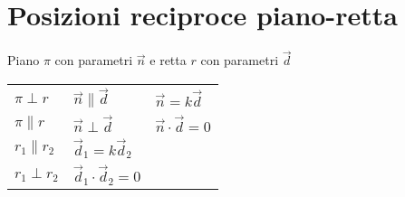\section{Posizioni reciproce piano-retta}
Piano $\pi$ con parametri $\vec{n}$ e retta $r$ con parametri $\vec{d}$

\begin{tabular}{lll}
	$\pi \perp r$ & $\vec{n} \parallel \vec{d}$ & $\vec{n} = k\vec{d}$ \\
	$\pi \parallel r$ & $\vec{n} \perp \vec{d}$ & $\vec{n} \cdot \vec{d} = 0$ \\
	$r_1 \parallel r_2$ & $\vec{d}_1 = k\vec{d}_2$ & \\
	$r_1 \perp r_2$ & $\vec{d}_1 \cdot \vec{d}_2 = 0$ & \\
\end{tabular}
